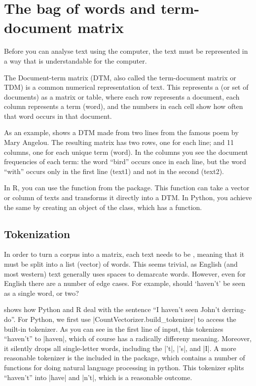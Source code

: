 \section{The bag of words and term-document matrix}
\label{sec:dtm}

Before you can analyse text using the computer, the text must be represented in a way that is understandable for the computer.

The Document-term matrix (DTM, also called the term-document matrix or TDM) is a common numerical representation of text.
This represents a  (or set of documents) as a matrix or table, where each row represents a document, each column represents a term (word),
and the numbers in each cell show how often that word occurs in that document.


As an example,  shows a DTM made from two lines from the famous poem by Mary Angelou.
The resulting matrix has two rows, one for each line; and 11 columns, one for each unique term (word).
In the columns you see the document frequencies of each term: the word ``bird'' occurs once in each line,
but the word ``with'' occurs only in the first line (text1) and not in the second (text2).

In R, you can use the  function from the  package.
This function can take a vector or column of texts and transforms it directly into a DTM.
In Python, you achieve the same by creating an object of the  class, which has a  function.


\subsection{Tokenization}

In order to turn a corpus into a matrix, each text needs to be ,
meaning that it must be split into a list (vector) of words.
This seems trivial, as English (and most western) text generally uses spaces to demarcate words.
However, even for English there are a number of edge cases. 
For example, should `haven't' be seen as a single word, or two?


 shows how Python and R deal with the sentence ``I haven't seen John't derring-do''.
For Python, we first use |CountVectorizer.build_tokenizer| to access the built-in tokenizer.
As you can see in the first line of input, this tokenizes ``haven't'' to |haven|,
which of course has a radically differeny meaning. Moreover, it silently drops all single-letter words,
including the |'t|, |'s|, and |I|.
A more reasonable tokenizer is the  included in the  package, which contains a number of functions for doing natural language processing in python.
This tokenizer splits ``haven't'' into |have| and |n't|, which is a reasonable outcome.

